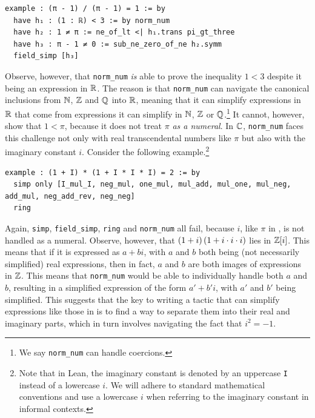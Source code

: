 \begin{lstlisting}[caption=An expression in $\R$ not handled immediately by simplification tactics, label=Ch5:Listing:pi_sub_one_norm_num_fail]
example : (π - 1) / (π - 1) = 1 := by
  have h₁ : (1 : ℝ) < 3 := by norm_num
  have h₂ : 1 ≠ π := ne_of_lt <| h₁.trans pi_gt_three
  have h₃ : π - 1 ≠ 0 := sub_ne_zero_of_ne h₂.symm
  field_simp [h₃]
\end{lstlisting}

Observe, however, that \lstinline|norm_num| \textit{is} able to prove the inequality $1 < 3$ despite it being an expression in $\mathbb{R}$. The reason is that \lstinline|norm_num| can navigate the canonical inclusions from $\mathbb{N}$, $\mathbb{Z}$ and $\mathbb{Q}$ into $\mathbb{R}$, meaning that it can simplify expressions in $\mathbb{R}$ that come from expressions it can simplify in $\mathbb{N}$, $\mathbb{Z}$ or $\mathbb{Q}$.\footnote{We say \lstinline|norm_num| can handle coercions.} It cannot, however, show that $1 < \pi$, because it does not treat $\pi$ \textit{as a numeral}. In $\mathbb{C}$, \lstinline|norm_num| faces this challenge not only with real transcendental numbers like $\pi$ but also with the imaginary constant $i$. Consider the following example.\footnote{Note that in Lean, the imaginary constant is denoted by an uppercase \lstinline|I| instead of a lowercase $i$. We will adhere to standard mathematical conventions and use a lowercase $i$ when referring to the imaginary constant in informal contexts.}

\begin{lstlisting}[caption={A nontrivial computation in $\C$, done formally}, label=Ch5:Listing:long_tactic_pf_example_complex]
example : (1 + I) * (1 + I * I * I) = 2 := by
  simp only [I_mul_I, neg_mul, one_mul, mul_add, mul_one, mul_neg, add_mul, neg_add_rev, neg_neg]
  ring
\end{lstlisting}

Again, \lstinline|simp|, \lstinline|field_simp|, \lstinline|ring| and \lstinline|norm_num| all fail, because $i$, like $\pi$ in , is not handled as a numeral. Observe, however, that $\left( 1 + i \right)\left( 1 + i \cdot i \cdot i \right)$ lies in $\mathbb{Z}[i]$. This means that if it is expressed as $a + bi$, with $a$ and $b$ both being (not necessarily simplified) real expressions, then in fact, $a$ and $b$ are both images of expressions in $\mathbb{Z}$. This means that \lstinline|norm_num| would be able to individually handle both $a$ and $b$, resulting in a simplified expression of the form $a' + b'i$, with $a'$ and $b'$ being simplified. This suggests that the key to writing a tactic that can simplify expressions like those in  is to find a way to separate them into their real and imaginary parts, which in turn involves navigating the fact that $i^2 = -1$.

